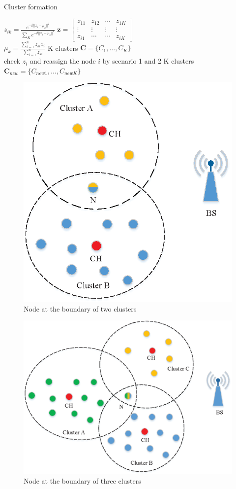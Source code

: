 \documentclass[11pt]{report}
\newcommand{\mb}{\mathbf}
\begin{document}
	 \begin{algorithm}[H]
	 	\caption{Cluster formation}
	 	\LinesNumbered %
	 	{
	 		{$z_{ik} = \frac{e^{-\beta||x_i-\mu_k||^2}}{\sum_{K}e^{-\beta||x_i-\mu_k||^2}}$}
	 		$\mb{z}={
	 			\left[ \begin{array}{cccc}
	 				z_{11} & z_{12} & \cdots & z_{1K}\\
	 				\vdots & \vdots & \vdots & \vdots\\
	 				z_{i1} & \cdots & \cdots & z_{iK}
	 			\end{array} 
	 			\right ]}$\\
 		    {$\mu_k = \frac{\sum_{i=1}^{n}z_{ki}x_{i}}{\sum_{i=1}^{n}z_{ki}}$}
 	    }
     	K clusters $\bm{C} = \{C_1,\dots,C_K\}$ \\
     	{check $z_i$ and reassign the node $i$ by scenario 1 and 2}
     	K clusters $\bm{C}_{new} = \{C_{new1},\dots,C_{newK}\}$ \\	
	 \end{algorithm}
 \begin{figure}[h!] 
 	\centering
 	\includegraphics[width=0.35\linewidth]{cha3.eps}
 	\caption{Node at the boundary of two clusters}
 	\label{fig5}
 \end{figure}
 \begin{figure}[h!]
 	\centering
 	\includegraphics[width=0.5\linewidth]{cha2.eps}
 	\caption{Node at the boundary of three clusters}
 	\label{fig6}
 \end{figure}
\end{document}
